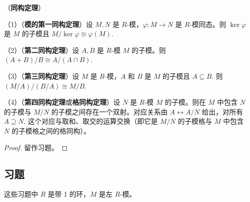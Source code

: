 \begin{theorem}\label{thm:10.4}
（\textbf{同构定理}）

（1）（\textbf{模的第一同构定理}）设 \(M, N\) 是 \(R\)-模，\(\varphi : M \to N\) 是 \(R\)-模同态。则 \(\ker\varphi\) 是 \(M\) 的子模且 \(M/\ker\varphi \cong \varphi(M)\).

（2）（\textbf{第二同构定理}）设 \(A, B\) 是 \(R\)-模 \(M\) 的子模。则 \((A+B)/B \cong A/(A \cap B)\).

（3）（\textbf{第三同构定理}）设 \(M\) 是 \(R\)-模，\(A\) 和 \(B\) 是 \(M\) 的子模且 \(A \subseteq B\). 则 \((M/A)/(B/A) \cong M/B\).

（4）（\textbf{第四同构定理}或\textbf{格同构定理}）设 \(N\) 是 \(R\)-模 \(M\) 的子模。则在 \(M\) 中包含 \(N\) 的子模与 \(M/N\) 的子模之间存在一个双射。对应关系由 \(A \leftrightarrow A/N\) 给出，对所有 \(A \supseteq N\). 这个对应与取和、取交的运算交换（即它是 \(M/N\) 的子模格与 \(M\) 中包含 \(N\) 的子模格之间的格同构）。
\end{theorem}

\begin{proof}
留作习题。
\end{proof}

\subsection*{习题}

\noindent 这些习题中 \(R\) 是带 1 的环，\(M\) 是左 \(R\)-模。

